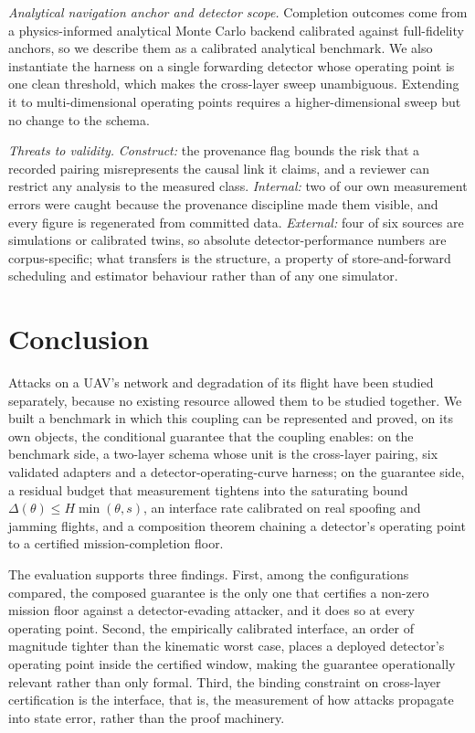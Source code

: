 \emph{Analytical navigation anchor and detector scope.} Completion outcomes come
from a physics-informed analytical Monte Carlo backend calibrated against
full-fidelity anchors, so we describe them as a calibrated analytical
benchmark. We also instantiate the harness on a single forwarding detector whose
operating point is one clean threshold, which makes the cross-layer sweep
unambiguous. Extending it to multi-dimensional operating points requires a
higher-dimensional sweep but no change to the schema.

\emph{Threats to validity.} \emph{Construct:} the provenance flag bounds the
risk that a recorded pairing misrepresents the causal link it claims, and a
reviewer can restrict any analysis to the measured class. \emph{Internal:} two
of our own measurement errors were caught because the provenance discipline made
them visible, and every figure is regenerated from committed data.
\emph{External:} four of six sources are simulations or calibrated twins, so
absolute detector-performance numbers are corpus-specific; what transfers is the
structure, a property of store-and-forward scheduling and
estimator behaviour rather than of any one simulator.

\section{Conclusion}
\label{sec:conclusion}
Attacks on a UAV's network and degradation of its flight have been studied
separately, because no existing resource allowed them to be studied together.
We built a benchmark in which this coupling can be represented and proved, on
its own objects, the conditional guarantee that the coupling enables: on the
benchmark side, a two-layer schema whose unit is the cross-layer pairing, six
validated adapters and a detector-operating-curve harness; on the guarantee
side, a residual budget that measurement tightens into the
saturating bound $\Delta(\theta)\le H\min(\theta,s)$, an interface rate
calibrated on real spoofing and jamming flights, and a composition theorem
chaining a detector's operating point to a certified mission-completion floor.

The evaluation supports three findings. First, among the configurations
compared, the composed guarantee is the only one that certifies a non-zero
mission floor against a detector-evading attacker, and it does so at every
operating point. Second, the empirically calibrated interface, an order of
magnitude tighter than the kinematic worst case, places a deployed detector's
operating point inside the certified window, making the guarantee operationally
relevant rather than only formal. Third, the binding constraint on cross-layer
certification is the interface, that is, the measurement of how attacks
propagate into state error, rather than the proof machinery.

